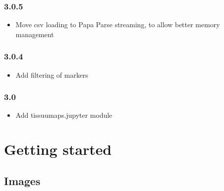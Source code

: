 \documentclass[letterpaper,10pt,english,openany,oneside]{sphinxmanual}
\begin{document}
\subsection{3.0.5}
\label{\detokenize{docs/intro/versions:id44}}\begin{itemize}
\item {} 
\sphinxAtStartPar
Move csv loading to Papa Parse streaming, to allow better memory management

\end{itemize}


\subsection{3.0.4}
\label{\detokenize{docs/intro/versions:id45}}\begin{itemize}
\item {} 
\sphinxAtStartPar
Add filtering of markers

\end{itemize}


\subsection{3.0}
\label{\detokenize{docs/intro/versions:id46}}\begin{itemize}
\item {} 
\sphinxAtStartPar
Add tissuumaps.jupyter module

\end{itemize}

\sphinxstepscope


\chapter{Getting started}
\label{\detokenize{docs/starting/index:getting-started}}\label{\detokenize{docs/starting/index::doc}}
\sphinxstepscope


\section{Images}
\label{\detokenize{docs/starting/images:images}}\label{\detokenize{docs/starting/images::doc}}
\end{document}
